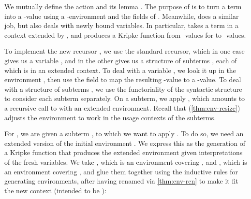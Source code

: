 

We mutually define the action  and its lemma
.
The purpose of  is to turn a term into a
\AgdaBound{$\C$}-value using a \AgdaBound{$\V$}-environment and the fields of
.
Meanwhile,  does a similar job, but also deals with
newly bound variables.
In particular,  takes a term in a context extended by
\AgdaBound{$\Theta$}, and produces a Kripke function from
\AgdaBound{$\V$}-values for \AgdaBound{$\Theta$} to \AgdaBound{$\C$}-values.


To implement the new recursor , we use the standard
recursor, which in one case gives us a variable , and in the other
gives us a structure of subterms , each of which is in an extended
context.
To deal with a variable , we look it
up in the environment \AgdaBound{$\rho$}, then use the
 field to map the resulting
\AgdaBound{$\V$}-value to a \AgdaBound{$\C$}-value.
To deal with a structure of subterms , we use the functoriality of
the syntactic structure to consider each subterm separately.
On a subterm, we apply , which amounts to a recursive call
to  with an extended environment.
Recall that  (\cref{thm:env-resize}) adjusts the
environment \AgdaBound{$\rho$} to work in the usage contexts of the subterms.


For , we are given a subterm , to
which we want to apply .  To do so, we need an
extended version of the initial environment \AgdaBound{$\rho$}. We
express this as the generation of a Kripke function that produces the
extended environment given interpretations of the fresh variables. We
take \AgdaBound{$\rho$}, which is an environment covering
\AgdaBound{$\Delta$}, and \AgdaBound{$\sigma$}, which is an
environment covering \AgdaBound{$\Theta$}, and glue them together
using the inductive rules for generating environments, after having
renamed \AgdaBound{$\rho$} via \cref{thm:env-ren} to make it fit the
new context \AgdaBound{$\Gamma^+$} (intended to be
):

